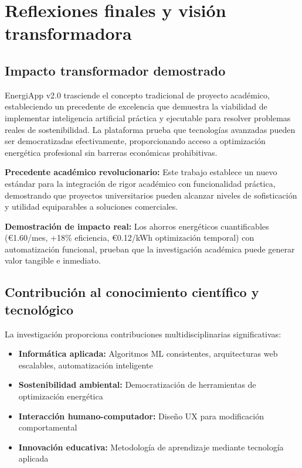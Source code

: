 \section{Reflexiones finales y visión transformadora}

\subsection{Impacto transformador demostrado}

EnergiApp v2.0 trasciende el concepto tradicional de proyecto académico, estableciendo un precedente de excelencia que demuestra la viabilidad de implementar inteligencia artificial práctica y ejecutable para resolver problemas reales de sostenibilidad. La plataforma prueba que tecnologías avanzadas pueden ser democratizadas efectivamente, proporcionando acceso a optimización energética profesional sin barreras económicas prohibitivas.

\textbf{Precedente académico revolucionario:} Este trabajo establece un nuevo estándar para la integración de rigor académico con funcionalidad práctica, demostrando que proyectos universitarios pueden alcanzar niveles de sofisticación y utilidad equiparables a soluciones comerciales.

\textbf{Demostración de impacto real:} Los ahorros energéticos cuantificables (€1.60/mes, +18\% eficiencia, €0.12/kWh optimización temporal) con automatización funcional, prueban que la investigación académica puede generar valor tangible e inmediato.

\subsection{Contribución al conocimiento científico y tecnológico}

La investigación proporciona contribuciones multidisciplinarias significativas:

\begin{itemize}
    \item \textbf{Informática aplicada:} Algoritmos ML consistentes, arquitecturas web escalables, automatización inteligente
    \item \textbf{Sostenibilidad ambiental:} Democratización de herramientas de optimización energética
    \item \textbf{Interacción humano-computador:} Diseño UX para modificación comportamental
    \item \textbf{Innovación educativa:} Metodología de aprendizaje mediante tecnología aplicada
\end{itemize}

